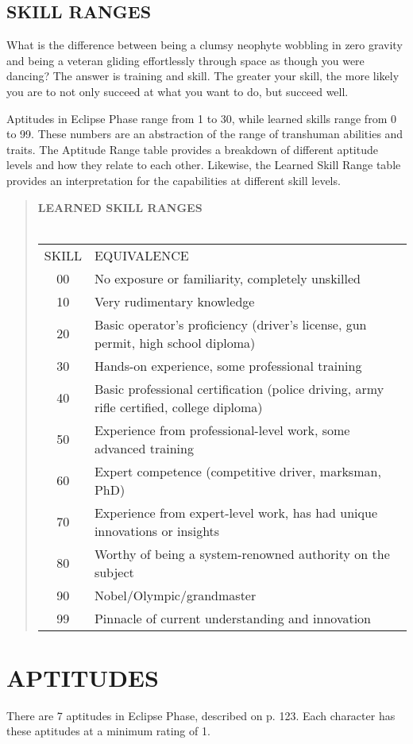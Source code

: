 \subsection{SKILL RANGES}
What is the difference between being a clumsy neophyte wobbling in zero gravity and being a veteran
gliding effortlessly through space as though you were
dancing? The answer is training and skill. The greater
your skill, the more likely you are to not only succeed
at what you want to do, but succeed well.

 Aptitudes in Eclipse Phase range from 1 to 30,
while learned skills range from 0 to 99. These numbers are an abstraction of the range of transhuman
abilities and traits. The Aptitude Range table provides
a breakdown of different aptitude levels and how they
relate to each other. Likewise, the Learned Skill Range
table provides an interpretation for the capabilities at
different skill levels.


\begin{quotation}
\textbf{LEARNED SKILL RANGES}
\\
\\
\begin{tabular}{cl}
SKILL & EQUIVALENCE \\
00 & No exposure or familiarity, completely unskilled \\
10 & Very rudimentary knowledge \\
20 & Basic operator’s proficiency (driver’s license, gun permit, high school diploma) \\
30 & Hands-on experience, some professional training \\
40 & Basic professional certification (police driving, army rifle certified, college diploma) \\
50 & Experience from professional-level work, some advanced training \\
60 & Expert competence (competitive driver, marksman, PhD) \\
70 & Experience from expert-level work, has had unique innovations or insights \\
80 & Worthy of being a system-renowned authority on the subject \\
90 & Nobel/Olympic/grandmaster \\
99 & Pinnacle of current understanding and innovation \\
\end{tabular}
\end{quotation}


\section{APTITUDES}
There are 7 aptitudes in Eclipse Phase, described on p.
123. Each character has these aptitudes at a minimum
rating of 1.


